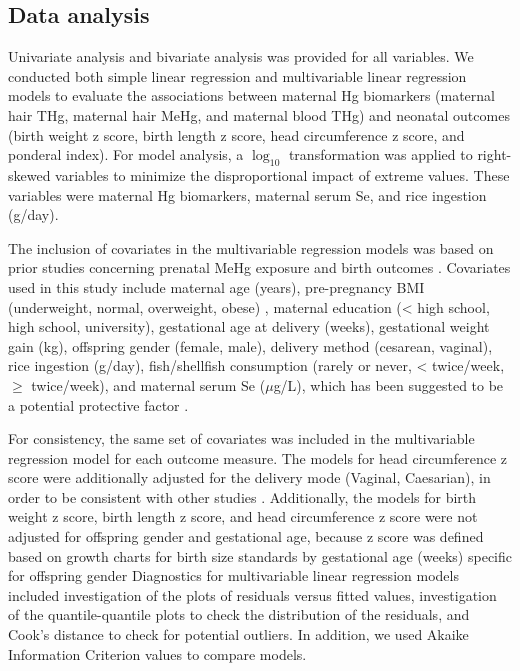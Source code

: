 \subsection{Data analysis}

Univariate analysis and bivariate analysis was provided for all variables. We conducted both simple linear regression and multivariable linear regression models to evaluate the associations between maternal Hg biomarkers (maternal hair THg, maternal hair MeHg, and maternal blood THg) and neonatal outcomes (birth weight z score, birth length z score, head circumference z score, and ponderal index). For model analysis, a $\log_{10}$ transformation was applied to right-skewed variables to minimize the disproportional impact of extreme values. These variables were maternal Hg biomarkers, maternal serum Se, and rice ingestion (g/day).

The inclusion of covariates in the multivariable regression models was based on prior studies concerning prenatal MeHg exposure and birth outcomes \citep{choi2008selenium,guo2013levels,ding2013prenatal,rothenberg2016maternal,wells2016cord}. Covariates used in this study include maternal age (years), pre-pregnancy BMI (underweight, normal, overweight, obese) \citep{who2004appropriate}, maternal education (< high school, high school, university), gestational age at delivery (weeks), gestational weight gain (kg), offspring gender (female, male), delivery method (cesarean, vaginal), rice ingestion (g/day), fish/shellfish consumption (rarely or never, < twice/week, ${\ge}$ twice/week), and maternal serum Se (${\mu}$g/L), which has been suggested to be a potential protective factor \citep{choi2008selenium,wells2016cord}.

For consistency, the same set of covariates was included in the multivariable regression model for each outcome measure. The models for head circumference z score were additionally adjusted for the delivery mode (Vaginal, Caesarian), in order to be consistent with other studies \citep{guo2013levels,wells2016cord}. Additionally, the models for birth weight z score, birth length z score, and head circumference z score were
not adjusted for offspring gender and gestational age, because z score was defined based on growth charts for birth size standards by gestational age (weeks) specific for offspring gender \citep{villar2014international} Diagnostics for multivariable linear regression models included investigation of the plots of residuals versus fitted values, investigation of the quantile-quantile plots to check the distribution of the residuals, and Cook's distance to check for potential outliers. In addition, we used Akaike Information Criterion values to compare models. 

